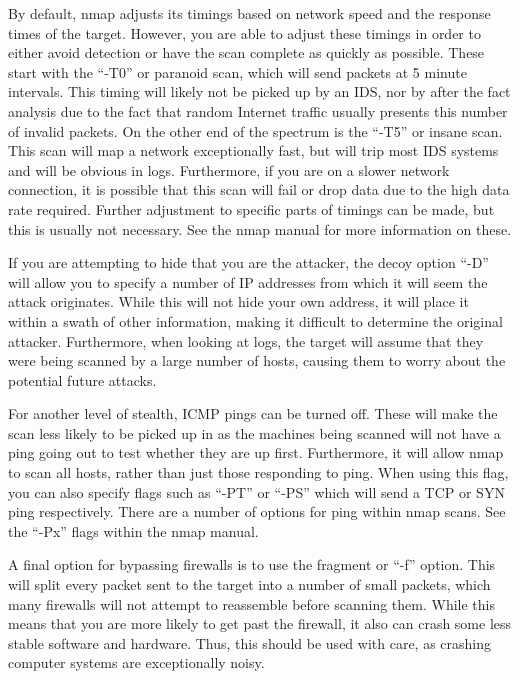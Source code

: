 			By default, nmap adjusts its timings based on network speed and the response times of the target.
			However, you are able to adjust these timings in order to either avoid detection or have the scan complete as quickly as possible.
			These start with the ``-T0'' or paranoid scan, which will send packets at 5 minute intervals.
			This timing will likely not be picked up by an IDS, nor by after the fact analysis due to the fact that random Internet traffic usually presents this number of invalid packets.
			On the other end of the spectrum is the ``-T5''  or insane scan.
			This scan will map a network exceptionally fast, but will trip most IDS systems and will be obvious in logs.
			Furthermore, if you are on a slower network connection, it is possible that this scan will fail or drop data due to the high data rate required.
			Further adjustment to specific parts of timings can be made, but this is usually not necessary.
			See the nmap manual for more information on these.

			If you are attempting to hide that you are the attacker, the decoy option ``-D'' will allow you to specify a number of IP addresses from which it will seem the attack originates.
			While this will not hide your own address, it will place it within a swath of other information, making it difficult to determine the original attacker.
			Furthermore, when looking at logs, the target will assume that they were being scanned by a large number of hosts, causing them to worry about the potential future attacks.

			For another level of stealth, ICMP pings can be turned off.
			These will make the scan less likely to be picked up in as the machines being scanned will not have a ping going out to test whether they are up first.
			Furthermore, it will allow nmap to scan all hosts, rather than just those responding to ping.
			When using this flag, you can also specify flags such as ``-PT'' or ``-PS'' which will send a TCP or SYN ping respectively.
			There are a number of options for ping within nmap scans. See the ``-Px'' flags within the nmap manual.

			A final option for bypassing firewalls is to use the fragment or ``-f'' option.
			This will split every packet sent to the target into a number of small packets, which many firewalls will not attempt to reassemble before scanning them.
			While this means that you are more likely to get past the firewall, it also can crash some less stable software and hardware.
			Thus, this should be used with care, as crashing computer systems are exceptionally noisy.
